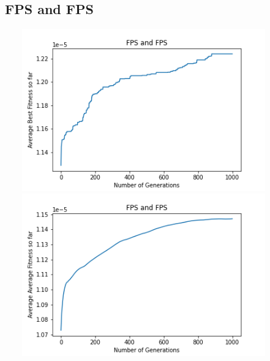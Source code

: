 \documentclass[a4paper]{article}
\begin{document}
\subsection{FPS and FPS}
\includegraphics[width=12cm, height=7cm]{Graphs/TSP/fps_fps_bsf.png} \\
\includegraphics[width=12cm, height=7cm]{Graphs/TSP/fps_fps_avg.png} \\
\end{document}
